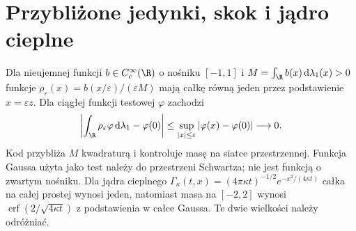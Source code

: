 \section{Przybliżone jedynki, skok i jądro cieplne}
Dla nieujemnej funkcji $b\in C_c^\infty(\R)$ o nośniku
$[-1,1]$ i $M=\int_\R b(x)\,\mathrm d\lambda_1(x)>0$
funkcje $\rho_\varepsilon(x)=b(x/\varepsilon)/(\varepsilon M)$
mają całkę równą jeden przez podstawienie $x=\varepsilon z$.
Dla ciągłej funkcji testowej $\varphi$ zachodzi
\[
 \left|\int_\R\rho_\varepsilon\varphi\,\mathrm d\lambda_1
 -\varphi(0)\right|
 \le\sup_{|x|\le\varepsilon}|\varphi(x)-\varphi(0)|
 \longrightarrow0.
\]
Kod przybliża $M$ kwadraturą i kontroluje masę na
siatce przestrzennej. Funkcja Gaussa użyta jako test
należy do przestrzeni Schwartza; nie jest funkcją
o zwartym nośniku. Dla jądra cieplnego
$\Gamma_\kappa(t,x)=(4\pi\kappa t)^{-1/2}
e^{-x^2/(4\kappa t)}$ całka na całej prostej wynosi
jeden, natomiast masa na $[-2,2]$ wynosi
$\operatorname{erf}(2/\sqrt{4\kappa t})$ z podstawienia
w całce Gaussa. Te dwie wielkości należy odróżniać.
